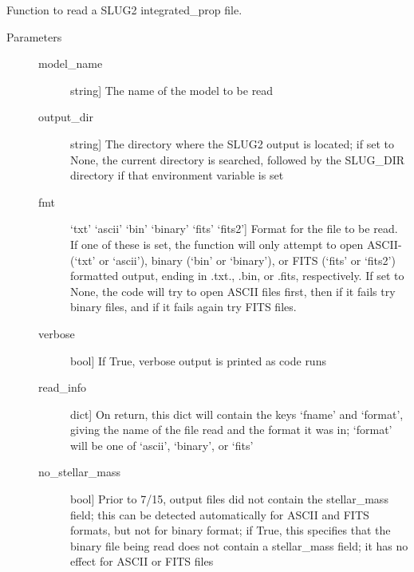 \documentclass[letterpaper,10pt,english]{sphinxmanual}
\begin{document}

\begin{fulllineitems}
\label{\detokenize{slugpy:slugpy.read_integrated_prop}}
Function to read a SLUG2 integrated\_prop file.
\begin{description}
\item[{Parameters}] \leavevmode\begin{description}
\item[{model\_name}] \leavevmode{[}string{]}
The name of the model to be read

\item[{output\_dir}] \leavevmode{[}string{]}
The directory where the SLUG2 output is located; if set to None,
the current directory is searched, followed by the SLUG\_DIR
directory if that environment variable is set

\item[{fmt}] \leavevmode{[}‘txt’ \textbar{} ‘ascii’ \textbar{} ‘bin’ \textbar{} ‘binary’ \textbar{} ‘fits’ \textbar{} ‘fits2’{]}
Format for the file to be read. If one of these is set, the
function will only attempt to open ASCII-(‘txt’ or ‘ascii’), 
binary (‘bin’ or ‘binary’), or FITS (‘fits’ or ‘fits2’)
formatted output, ending in .txt., .bin, or .fits,
respectively. If set to None, the code will try to open
ASCII files first, then if it fails try binary files, and if
it fails again try FITS files.

\item[{verbose}] \leavevmode{[}bool{]}
If True, verbose output is printed as code runs

\item[{read\_info}] \leavevmode{[}dict{]}
On return, this dict will contain the keys ‘fname’ and
‘format’, giving the name of the file read and the format it
was in; ‘format’ will be one of ‘ascii’, ‘binary’, or ‘fits’

\item[{no\_stellar\_mass}] \leavevmode{[}bool{]}
Prior to 7/15, output files did not contain the stellar\_mass
field; this can be detected automatically for ASCII and FITS
formats, but not for binary format; if True, this specifies
that the binary file being read does not contain a
stellar\_mass field; it has no effect for ASCII or FITS files


\end{description}
\end{description}
\end{fulllineitems}
\end{document}
